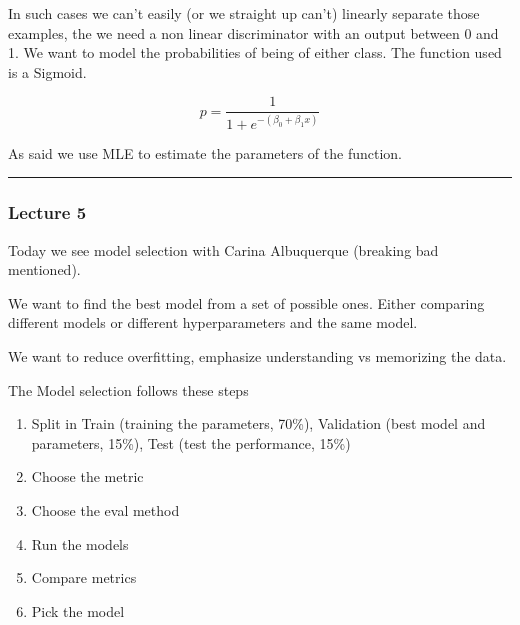 In such cases we can't easily (or we straight up can't) linearly separate those examples, the we need a non linear discriminator with an output between 0 and 1. We want to model the probabilities of being of either class. The function used is a Sigmoid.

\begin{equation}
    p = \frac{1}{1 + e^{-(\beta_0 +\beta_1x)}}
\end{equation}

As said we use MLE to estimate the parameters of the function.

\vspace{10pt}

\hrule

\vspace{10pt}

\subsubsection{Lecture 5}

Today we see model selection with Carina Albuquerque (breaking bad mentioned).

\vspace{10pt}

We want to find the best model from a set of possible ones. Either comparing different models or different hyperparameters and the same model.

\vspace{10pt}

We want to reduce overfitting, emphasize understanding vs memorizing the data.

\vspace{10pt}

The Model selection follows these steps

\begin{enumerate}
    \item Split in Train (training the parameters, 70\%), Validation (best model and parameters, 15\%), Test (test the performance, 15\%)

    \item Choose the metric

    \item Choose the eval method

    \item Run the models

    \item Compare metrics

    \item Pick the model
    
\end{enumerate}


